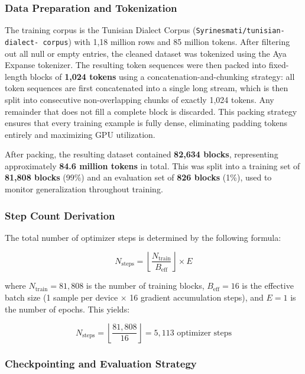 \documentclass[12pt,a4paper]{report}
\begin{document}
\subsubsection{Data Preparation and Tokenization}

The training corpus is the Tunisian Dialect Corpus
(\texttt{Syrinesmati/tunisian-dialect-    corpus}) with 1,18 million rows and 85 million tokens. After filtering out all null
or empty entries, the cleaned dataset was tokenized using the Aya Expanse
tokenizer. The resulting token sequences were then packed into fixed-length
blocks of \textbf{1,024 tokens} using a concatenation-and-chunking strategy:
all token sequences are first concatenated into a single long stream, which is
then split into consecutive non-overlapping chunks of exactly 1,024 tokens.
Any remainder that does not fill a complete block is discarded. This packing
strategy ensures that every training example is fully dense, eliminating
padding tokens entirely and maximizing GPU utilization.

After packing, the resulting dataset contained \textbf{82,634 blocks},
representing approximately \textbf{84.6 million tokens} in total. This was
split into a training set of \textbf{81,808 blocks} (99\%) and an evaluation
set of \textbf{826 blocks} (1\%), used to monitor generalization throughout
training.

\subsubsection{Step Count Derivation}

The total number of optimizer steps is determined by the following formula:

\begin{equation}
    N_{\text{steps}} = \left\lfloor \frac{N_{\text{train}}}{B_{\text{eff}}}
    \right\rfloor \times E
\end{equation}

\noindent where $N_{\text{train}} = 81{,}808$ is the number of training
blocks, $B_{\text{eff}} = 16$ is the effective batch size (1 sample per device
$\times$ 16 gradient accumulation steps), and $E = 1$ is the number of epochs.
This yields:

\begin{equation}
    N_{\text{steps}} = \left\lfloor \frac{81{,}808}{16} \right\rfloor = 5{,}113
    \text{ optimizer steps}
\end{equation}

\subsubsection{Checkpointing and Evaluation Strategy}
\end{document}
